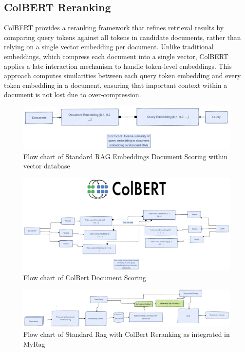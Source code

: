 \documentclass[pdflatex,sn-mathphys-num]{sn-jnl}%
\theoremstyle{thmstyleone}%
\theoremstyle{thmstyletwo}%
\theoremstyle{thmstylethree}%
\begin{document}
\subsection{ColBERT Reranking} \label{subsec3.5}
ColBERT \cite{khattab2020colbert} provides a reranking framework that refines retrieval results by comparing query tokens against all tokens in candidate documents, rather than relying on a single vector embedding per document. Unlike traditional embeddings, which compress each document into a single vector, ColBERT applies a late interaction mechanism to handle token-level embeddings. This approach computes similarities between each query token embedding and every token embedding in a document, ensuring that important context within a document is not lost due to over-compression.


\begin{figure}[h]
	\centering
	\includegraphics[width=\linewidth]{StandardRAGDocumentScoring.pdf}
	\caption{Flow chart of Standard RAG Embeddings Document Scoring within vector database}
	\label{fig:standard_doc_scoring}
\end{figure}

\begin{figure}[h]
	\centering
	\includegraphics[width=\linewidth]{Colbert.pdf}
	\caption{Flow chart of ColBert Document Scoring}
	\label{fig:colbert}
\end{figure}

\begin{figure}[h]
	\centering
	\includegraphics[width=\linewidth]{StandardRagWithReRanking.pdf}
	\caption{Flow chart of Standard Rag with ColBert Reranking as integrated in MyRag}
	\label{fig:reranking_rag}
\end{figure}
\end{document}
